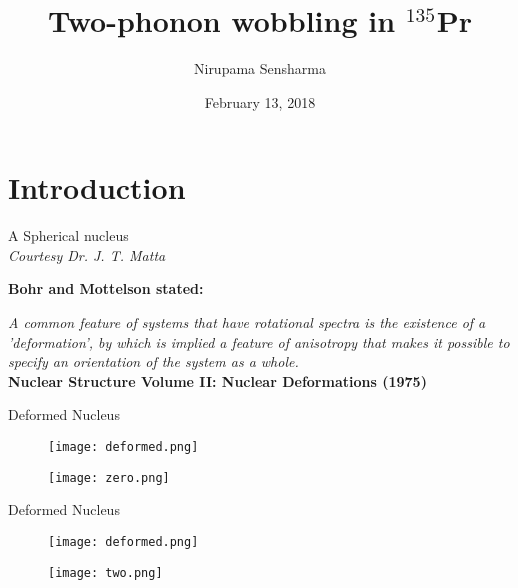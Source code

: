 \documentclass [11pt]{beamer}
\title{Two-phonon wobbling in $^{135}$Pr}
\date{February 13, 2018}
\author{Nirupama Sensharma}
\institute{University of Notre Dame}
\begin{document}
\maketitle


\section{Introduction}

\begin{frame}{A Spherical nucleus}
	\centering 
{}  
\\\tiny{\textit{Courtesy Dr. J. T. Matta}}
\end{frame} 

\begin{frame}
\begin{center}
\textbf{Bohr and Mottelson stated:}
\end{center} 

\textit{A common feature of systems that have rotational spectra is the existence of a 'deformation', by which is implied a feature of anisotropy that makes it possible to specify an orientation of the system as a whole.}\\
\vspace{0.6in}
\hspace{1.8in}
{\tiny {\textbf{Nuclear Structure Volume II: Nuclear Deformations (1975)}}}

\end{frame}	

\begin{frame}{Deformed Nucleus}
\begin{multicols}{2}
\begin{figure}
\texttt{[image: deformed.png]}
\end{figure}
\begin{center}
\begin{figure}
\texttt{[image: zero.png]}
\end{figure}
\end{center}
\end{multicols}
\end{frame}

\begin{frame}{Deformed Nucleus}
\begin{multicols}{2}
\begin{figure}
\texttt{[image: deformed.png]}
\end{figure}
\begin{center}
\begin{figure}
\texttt{[image: two.png]}
\end{figure}
\end{center}
\end{multicols}
\end{frame}
\end{document}
